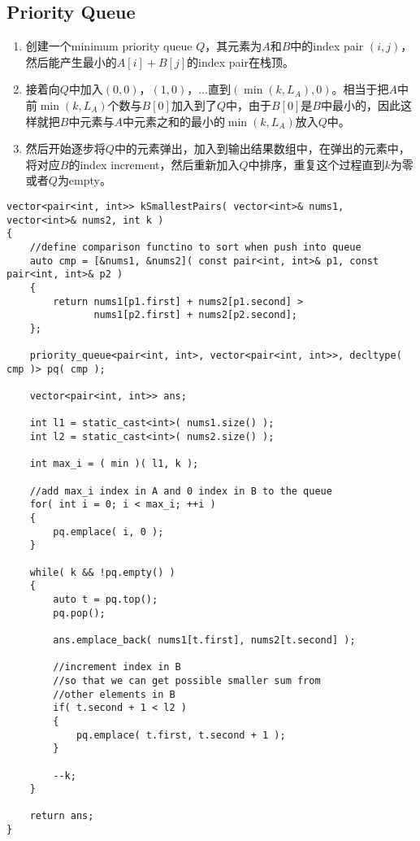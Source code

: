 \subsection{Priority Queue}
\begin{enumerate}
\item 创建一个minimum priority queue $ Q $，其元素为$A$和$B$中的index pair $ (i,j) $，然后能产生最小的$A[i]+B[j]$的index pair在栈顶。
\item 接着向$Q$中加入$(0,0)$，$ (1,0) $，$\ldots$直到$(\min(k, L_A),0)$。相当于把$A$中前$\min(k, L_A)$个数与$B[0]$加入到了$Q$中，由于$B[0]$是$B$中最小的，因此这样就把$B$中元素与$A$中元素之和的最小的$\min(k, L_A)$放入$ Q $中。
\item 然后开始逐步将$Q$中的元素弹出，加入到输出结果数组中，在弹出的元素中，将对应$B$的index increment，然后重新加入$Q$中排序，重复这个过程直到$k$为零或者$Q$为empty。
\end{enumerate}

\setcounter{lstlisting}{0}
\begin{lstlisting}[style=customc, caption={Priority Queue}]
vector<pair<int, int>> kSmallestPairs( vector<int>& nums1, vector<int>& nums2, int k )
{
    //define comparison functino to sort when push into queue
    auto cmp = [&nums1, &nums2]( const pair<int, int>& p1, const pair<int, int>& p2 )
    {
        return nums1[p1.first] + nums2[p1.second] >
               nums1[p2.first] + nums2[p2.second];
    };

    priority_queue<pair<int, int>, vector<pair<int, int>>, decltype( cmp )> pq( cmp );

    vector<pair<int, int>> ans;

    int l1 = static_cast<int>( nums1.size() );
    int l2 = static_cast<int>( nums2.size() );

    int max_i = ( min )( l1, k );

    //add max_i index in A and 0 index in B to the queue
    for( int i = 0; i < max_i; ++i )
    {
        pq.emplace( i, 0 );
    }

    while( k && !pq.empty() )
    {
        auto t = pq.top();
        pq.pop();

        ans.emplace_back( nums1[t.first], nums2[t.second] );

        //increment index in B
        //so that we can get possible smaller sum from
        //other elements in B
        if( t.second + 1 < l2 )
        {
            pq.emplace( t.first, t.second + 1 );
        }

        --k;
    }

    return ans;
}
\end{lstlisting}